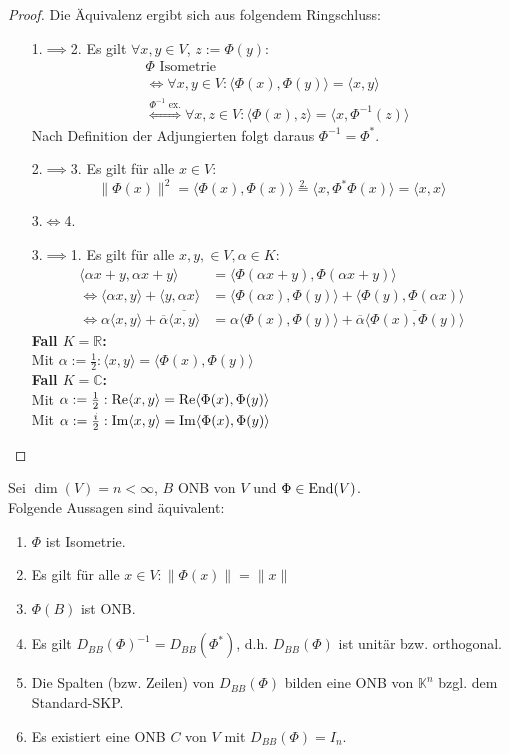 \documentclass[parskip,a4paper,twoside,DIV15,BCOR12mm]{scrbook}
\begin{document}
\begin{proof}
Die Äquivalenz ergibt sich aus folgendem Ringschluss:
\begin{enumerate}
\item[1.$\implies$2.] Es gilt $\forall x,y\in V$, $z:=\Phi(y)$:
\begin{align*}
&\Phi \text{ Isometrie}\\
&\iff \forall x,y\in V:\langle\Phi(x),\Phi(y)\rangle =\langle x,y\rangle\\
&\stackrel{\Phi^{-1}\text{ ex.}}{\iff} \forall x,z\in V:\langle\Phi(x),z\rangle
=\langle x,\Phi^{-1}(z)\rangle
\end{align*}
Nach Definition der Adjungierten folgt daraus $\Phi^{-1} = \Phi^*$.
\item[2.$\implies$3.] Es gilt für alle $x\in V$:
\[\|\Phi(x)\|^2=\langle\Phi(x),\Phi(x)\rangle\stackrel{2.}{=}
\langle x,\Phi^*\Phi(x)\rangle=\langle x,x\rangle\]
\item[3.$\iff$4.] \checkmark
\item[3.$\implies$1.] Es gilt für alle $x,y,\in V,\alpha\in K:$
\begin{align*}
\langle\alpha x+y,\alpha x+y\rangle &= \langle\Phi(\alpha x+y),\Phi(\alpha x+y)\rangle\\
\iff\langle \alpha x,y\rangle +\langle y,\alpha x\rangle &= \langle\Phi(\alpha x),
\Phi(y)\rangle + \langle\Phi(y),\Phi(\alpha x)\rangle\\
\iff\alpha\langle x,y\rangle +\overline{\alpha}\overline{\langle x,y\rangle} &=
\alpha\langle\Phi(x),\Phi(y)\rangle + \overline{\alpha}\overline{\langle\Phi(x),\Phi(y)\rangle}
\end{align*}
\textbf{Fall $K=\mathbb{R}$:}\\ 
Mit $\alpha:=\frac12:\langle x,y\rangle =\langle\Phi(x),\Phi(y)\rangle$\\
\textbf{Fall $K=\mathbb{C}$:}\\ 
Mit $\alpha:=\frac12:\operatorname{Re}\langle x,y\rangle =\operatorname{Re}\langle\Phi(x),\Phi(y)\rangle$\\
Mit $\alpha:=\frac i2:\operatorname{Im}\langle x,y\rangle =\operatorname{Im}\langle\Phi(x),\Phi(y)\rangle$
\end{enumerate}
\end{proof}

\begin{corollary}
Sei $\dim(V)=n<\infty$, $B$ ONB von $V$ und $\Phi\in\operatorname{End}(V)$.\\
Folgende Aussagen sind äquivalent:
\begin{enumerate}
\item $\Phi$ ist Isometrie.
\item Es gilt für alle $x\in V:\|\Phi(x)\|=\|x\|$
\item $\Phi(B)$ ist ONB.
\item Es gilt $D_{BB}(\Phi)^{-1} = D_{BB}(\Phi^*)$, d.h. $D_{BB}(\Phi)$ ist unitär bzw. orthogonal.
\item Die Spalten (bzw. Zeilen) von $D_{BB}(\Phi)$ bilden eine ONB von $\mathbb{K}^n$ bzgl.
dem Standard-SKP.
\item Es existiert eine ONB $C$ von $V$ mit $D_{BB}(\Phi)=I_n$.
\end{enumerate}
\end{corollary}
\end{document}
